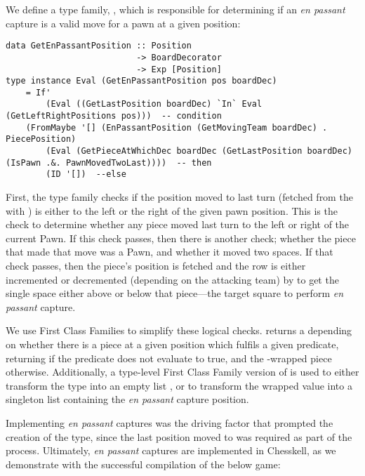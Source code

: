 We define a type family, , which is responsible for determining if an \emph{en passant} capture is a valid move for a pawn at a given position:

\begin{lstlisting}
data GetEnPassantPosition :: Position
                          -> BoardDecorator
                          -> Exp [Position]
type instance Eval (GetEnPassantPosition pos boardDec)
    = If'
        (Eval ((GetLastPosition boardDec) `In` Eval (GetLeftRightPositions pos)))  -- condition
    (FromMaybe '[] (EnPassantPosition (GetMovingTeam boardDec) . PiecePosition)
        (Eval (GetPieceAtWhichDec boardDec (GetLastPosition boardDec) (IsPawn .&. PawnMovedTwoLast))))  -- then
        (ID '[])  --else
\end{lstlisting}

First, the type family checks if the position moved to last turn (fetched from the  with ) is either to the left or the right of the given pawn position. This is the check to determine whether any piece moved last turn to the left or right of the current Pawn. If this check passes, then there is another check; whether the piece that made that move was a Pawn, and whether it moved two spaces. If that check passes, then the piece's position is fetched and the row is either incremented or decremented (depending on the attacking team) by  to get the single space either above or below that piece---the target square to perform \emph{en passant} capture.

We use First Class Families to simplify these logical checks.  returns a  depending on whether there is a piece at a given position which fulfils a given predicate, returning  if the predicate does not evaluate to true, and the -wrapped piece otherwise. Additionally, a type-level First Class Family version of  is used to either transform the  type into an empty list , or to transform the wrapped value into a singleton list containing the \emph{en passant} capture position.

Implementing \emph{en passant} captures was the driving factor that prompted the creation of the  type, since the last position moved to was required as part of the process. Ultimately, \emph{en passant} captures are implemented in Chesskell, as we demonstrate with the successful compilation of the below game:

